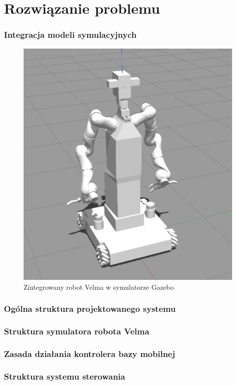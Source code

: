 \section{Rozwiązanie problemu} 

\begin{frame}
    \frametitle{Integracja modeli symulacyjnych}
    \begin{figure}
        \includegraphics[scale=0.20]{./images/omnivelmobil-final-cropped.png}
        \caption{Zintegrowany robot Velma w symulatorze Gazebo}
    \end{figure}
\end{frame}

\begin{frame}
    \frametitle{Ogólna struktura projektowanego systemu} 
\end{frame}

\begin{frame}
    \frametitle{Struktura symulatora robota Velma} 
\end{frame}

\begin{frame}
    \frametitle{Zasada działania kontrolera bazy mobilnej} 
\end{frame}

\begin{frame}
    \frametitle{Struktura systemu sterowania} 
\end{frame}




